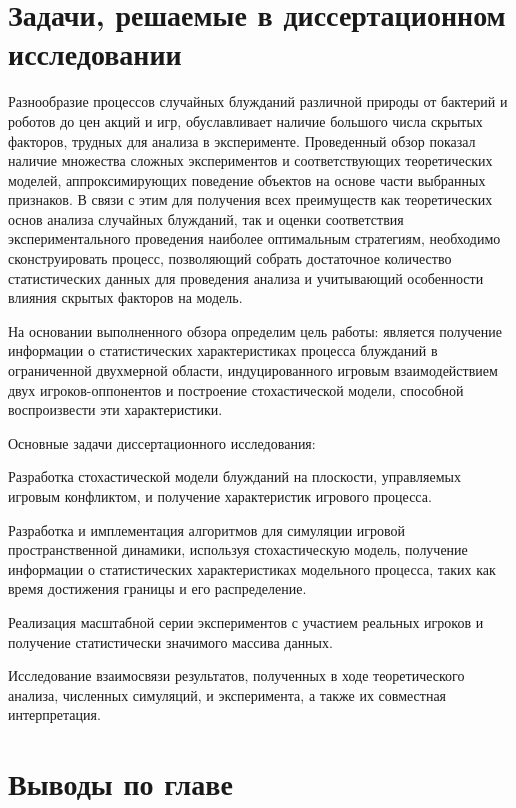 \section{Задачи, решаемые в диссертационном исследовании}\label{sec:ch1/sec4}

Разнообразие процессов случайных блужданий различной природы от бактерий и роботов до 
цен акций и игр, обуславливает наличие большого числа скрытых факторов, трудных для анализа в эксперименте.
Проведенный обзор показал наличие множества сложных экспериментов и соответствующих теоретических моделей,
аппроксимирующих поведение объектов на основе части выбранных признаков. В связи с этим для получения
всех преимуществ как теоретических основ анализа случайных блужданий, так и оценки соответствия экспериментального проведения
наиболее оптимальным стратегиям, необходимо сконструировать процесс, позволяющий собрать достаточное количество 
статистических данных для проведения анализа и учитывающий особенности влияния скрытых факторов на модель.

На основании выполненного обзора определим цель работы: является получение информации о статистических
характеристиках процесса блужданий в ограниченной двухмерной области, индуцированного игровым
взаимодействием двух игроков-оппонентов и построение стохастической модели, способной воспроизвести эти характеристики.

Основные задачи диссертационного исследования:
\item Разработка стохастической модели блужданий на плоскости, управляемых
игровым конфликтом, и получение характеристик игрового процесса.
\item Разработка и имплементация алгоритмов для симуляции
игровой пространственной динамики, используя стохастическую
модель, получение информации о статистических характеристиках
модельного процесса, таких как время достижения границы и его
распределение.
\item Реализация масштабной серии экспериментов с участием
реальных игроков и получение статистически значимого массива
данных.
\item Исследование взаимосвязи результатов, полученных в ходе
теоретического анализа, численных симуляций, и эксперимента, а
также их совместная интерпретация.

\section{Выводы по главе}\label{sec:ch1/sec5}

